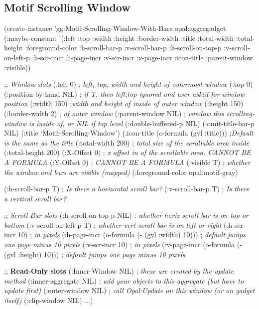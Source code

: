 \begin{group}
\section{Motif Scrolling Window}
\label{motif-scrolling-window}

\begin{programexample}
(create-instance 'gg:Motif-Scrolling-Window-With-Bars opal:aggregadget
   (:maybe-constant '(:left :top :width :height :border-width :title :total-width
                      :total-height :foreground-color :h-scroll-bar-p :v-scroll-bar-p
		      :h-scroll-on-top-p :v-scroll-on-left-p :h-scr-incr :h-page-incr
                      :v-scr-incr :v-page-incr :icon-title :parent-window :visible))

   ;; {\it Window slots}
   (:left 0)  ; {\it left, top, width and height of outermost window}
   (:top 0)
   (:position-by-hand NIL) ; {\it if T, then left,top ignored and user asked for window position}
   (:width 150) ;{\it width and height of inside of outer window}
   (:height 150)
   (:border-width 2) ; {\it of outer window}
   (:parent-window NIL) ; {\it window this scrolling-window is inside of, or NIL if top level}
   (:double-buffered-p NIL)
   (:omit-title-bar-p NIL)
   (:title `Motif-Scrolling-Window')
   (:icon-title (o-formula (gvl :title))) ;{\it Default is the same as the title}
   (:total-width 200)   ; {\it total size of the scrollable area inside}
   (:total-height 200)
   (:X-Offset 0)  ; {\it x offset in of the scrollable area. CANNOT BE A FORMULA}
   (:Y-Offset 0)  ; {\it CANNOT BE A FORMULA}
   (:visible T)  ; {\it whether the window and bars are visible (mapped)}
   (:foreground-color opal:motif-gray)

   (:h-scroll-bar-p T)  ; {\it Is there a horizontal scroll bar?}
   (:v-scroll-bar-p T)  ; {\it Is there a vertical scroll bar?}

   ;; {\it Scroll Bar slots}
   (:h-scroll-on-top-p NIL)  ; {\it whether horiz scroll bar is on top or bottom}
   (:v-scroll-on-left-p T)   ; {\it whether vert scroll bar is on left or right}
   (:h-scr-incr 10)  ; {\it in pixels}
   (:h-page-incr (o-formula (- (gvl :width) 10))) ; {\it default jumps one page minus 10 pixels}
   (:v-scr-incr 10)  ; {\it in pixels}
   (:v-page-incr (o-formula (- (gvl :height) 10))) ; {\it default jumps one page minus 10 pixels}

   ;; {\bf Read-Only slots}
   (:Inner-Window NIL)  ; {\it these are created by the update method}
   (:inner-aggregate NIL) ; {\it add your objects to this aggregate (but have to update first)}
   (:outer-window NIL) ; {\it call Opal:Update on this window (or on gadget itself)}
   (:clip-window NIL)
   ...)
\end{programexample}
\end{group}

